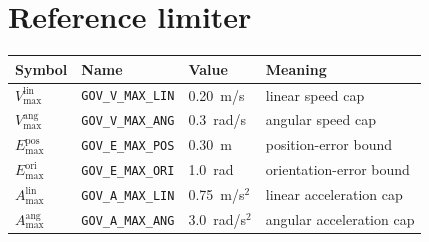 \section{Reference limiter}
\begin{tabularx}{\linewidth}{@{}l>{\scriptsize}ll>{\raggedright\arraybackslash}X@{}}
\toprule
Symbol & Name & Value & Meaning \\
\midrule
$V_{\max}^{\text{lin}}$ & \texttt{GOV\_V\_MAX\_LIN} & 0.20~m/s & linear speed cap \\
$V_{\max}^{\text{ang}}$ & \texttt{GOV\_V\_MAX\_ANG} & 0.3~rad/s & angular speed cap \\
$E_{\max}^{\text{pos}}$ & \texttt{GOV\_E\_MAX\_POS} & 0.30~m & position-error bound \\
$E_{\max}^{\text{ori}}$ & \texttt{GOV\_E\_MAX\_ORI} & 1.0~rad & orientation-error bound \\
$A_{\max}^{\text{lin}}$ & \texttt{GOV\_A\_MAX\_LIN} & 0.75~m/s$^2$ & linear acceleration cap \\
$A_{\max}^{\text{ang}}$ & \texttt{GOV\_A\_MAX\_ANG} & 3.0~rad/s$^2$ & angular acceleration cap \\
\bottomrule
\end{tabularx}

